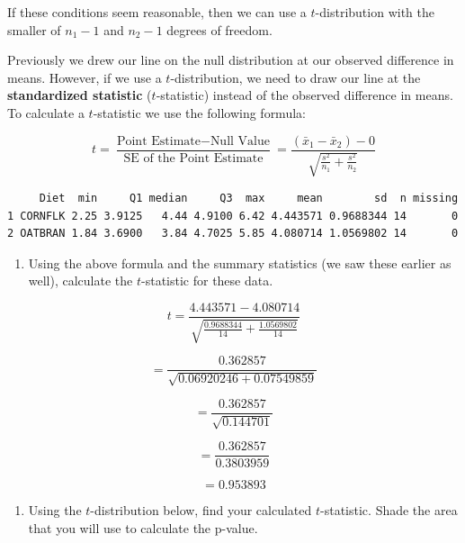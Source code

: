 \documentclass[
  letterpaper,
  DIV=11,
  numbers=noendperiod]{scrartcl}
\providecommand{\tightlist}{%
  \setlength{\itemsep}{0pt}\setlength{\parskip}{0pt}}\usepackage{longtable,booktabs,array}
\begin{document}
If these conditions seem reasonable, then we can use a
\(t\)-distribution with the smaller of \(n_1 - 1\) and \(n_2 - 1\)
degrees of freedom.

\vspace{0.2cm}

Previously we drew our line on the null distribution at our observed
difference in means. However, if we use a \(t\)-distribution, we need to
draw our line at the \textbf{standardized statistic} (\(t\)-statistic)
instead of the observed difference in means. To calculate a
\(t\)-statistic we use the following formula:

\[
t = \frac{\text{Point Estimate} - \text{Null Value}}{\text{SE of the Point Estimate}}=\frac{(\bar{x}_1 - \bar{x}_2) - 0}{\sqrt{\frac{s^2}{n_1} + \frac{s^2}{n_2}}}
\]

\vspace{0.1in}

\begin{verbatim}
     Diet  min     Q1 median     Q3  max     mean        sd  n missing
1 CORNFLK 2.25 3.9125   4.44 4.9100 6.42 4.443571 0.9688344 14       0
2 OATBRAN 1.84 3.6900   3.84 4.7025 5.85 4.080714 1.0569802 14       0
\end{verbatim}

\vspace{0.1in}

\begin{enumerate}
\def\labelenumi{\arabic{enumi}.}
\setcounter{enumi}{25}
\tightlist
\item
  Using the above formula and the summary statistics (we saw these
  earlier as well), calculate the \(t\)-statistic for these data.
\end{enumerate}

\[t = \frac{4.443571 - 4.080714}{\sqrt{\frac{0.9688344}{14} + \frac{1.0569802}{14}}}\]

\[ = \frac{0.362857}{\sqrt{0.06920246 + 0.07549859}}\]

\[ = \frac{0.362857}{\sqrt{0.144701}}\]

\[ = \frac{0.362857}{0.3803959}\]

\[ = 0.953893\]

\begin{enumerate}
\def\labelenumi{\arabic{enumi}.}
\setcounter{enumi}{26}
\tightlist
\item
  Using the \(t\)-distribution below, find your calculated
  \(t\)-statistic. Shade the area that you will use to calculate the
  p-value.
\end{enumerate}
\end{document}
